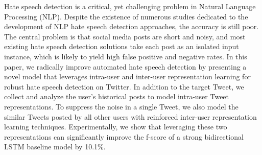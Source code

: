 Hate speech detection is a critical, yet challenging problem in Natural Language Processing (NLP). Despite the existence of numerous studies dedicated to the development of NLP hate speech detection approaches, the accuracy is still poor. The central problem is that social media posts are short and noisy, and most existing hate speech detection solutions take each post as an isolated input instance, which is likely to yield high false positive and negative rates. In this paper, we radically improve automated hate speech detection by presenting a novel model that leverages intra-user and inter-user representation learning for robust hate speech detection on Twitter. In addition to the target Tweet, we collect and analyze the user's historical posts to model intra-user Tweet representations. To suppress the noise in a single Tweet, we also model the similar Tweets posted by all other users with reinforced inter-user representation learning techniques. Experimentally, we show that leveraging these two representations can significantly improve the f-score of a strong bidirectional LSTM baseline model by 10.1\%.
